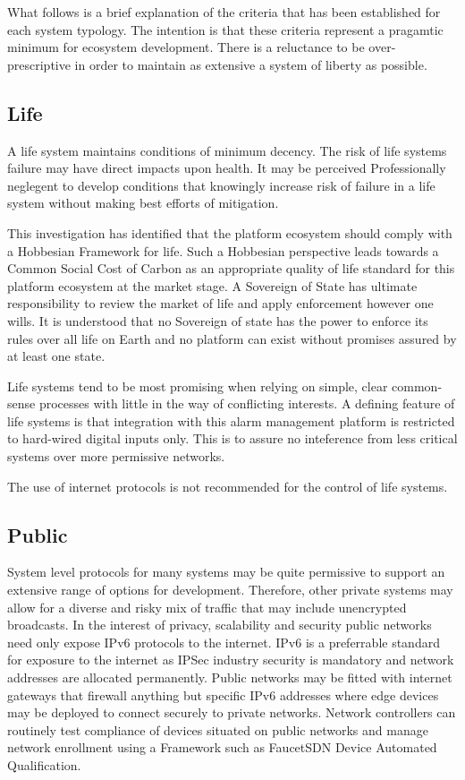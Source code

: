 \documentclass[11pt, oneside]{article}   	%
\begin{document}
What follows is a brief explanation of the criteria that has been established for each system typology.
The intention is that these criteria represent a pragamtic minimum for ecosystem development.
There is a reluctance to be over-prescriptive in order to maintain as extensive a system of liberty as possible.

\subsection{Life}
A life system maintains conditions of minimum decency.
The risk of life systems failure may have direct impacts upon health.
It may be perceived Professionally neglegent to develop conditions that knowingly increase risk of failure in a life system without making best efforts of mitigation.\

This investigation has identified that the platform ecosystem should comply with a Hobbesian Framework for life.
Such a Hobbesian perspective leads towards a Common Social Cost of Carbon as an appropriate quality of life standard for this platform ecosystem at the market stage.
A Sovereign of State has ultimate responsibility to review the market of life and apply enforcement however one wills.
It is understood that no Sovereign of state has the power to enforce its rules over all life on Earth and no platform can exist without promises assured by at least one state.\

Life systems tend to be most promising when relying on simple, clear common-sense processes with little in the way of conflicting interests.
A defining feature of life systems is that integration with this alarm management platform is restricted to hard-wired digital inputs only.
This is to assure no inteference from less critical systems over more permissive networks.\

The use of internet protocols is not recommended for the control of life systems.\

\subsection{Public}
System level protocols for many systems may be quite permissive to support an extensive range of options for development.
Therefore, other private systems may allow for a diverse and risky mix of traffic that may include unencrypted broadcasts.
In the interest of privacy, scalability and security public networks need only expose IPv6 protocols to the internet.
IPv6 is a preferrable standard for exposure to the internet as IPSec industry security is mandatory and network addresses are allocated permanently.
Public networks may be fitted with internet gateways that firewall anything but specific IPv6 addresses where edge devices may be deployed to connect securely to private networks.
Network controllers can routinely test compliance of devices situated on public networks and manage network enrollment using a Framework such as FaucetSDN Device Automated Qualification.\
\end{document}
